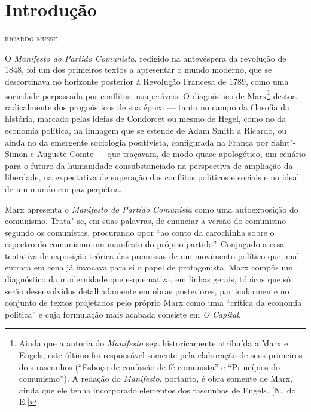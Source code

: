 \pagestyle{plain}


\chapter*{Introdução}
\begin{flushright}
\textsc{ricardo musse}
\end{flushright}

\noindent{}O \textit{Manifesto do Partido Comunista}, redigido na antevéspera da
revolução de 1848, foi um dos primeiros textos a apresentar o mundo
moderno, que se descortinava no horizonte posterior à Revolução
Francesa de 1789, como uma sociedade perpassada por conflitos
insuperáveis. O diagnóstico de Marx\footnote{ Ainda que a autoria do \textit{Manifesto} 
seja historicamente atribuída a Marx e Engels, este último foi responsável somente pela 
elaboração de seus primeiros dois rascunhos (“Esboço de confissão de fé comunista” e “Princípios do comunismo”). 
A redação do \textit{Manifesto}, portanto, é obra somente de Marx, ainda que ele tenha incorporado 
elementos dos rascunhos de Engels. [N.~do E.]} destoa radicalmente dos
prognósticos de sua época --- tanto no campo da filosofia da história,
marcado pelas ideias de Condorcet ou mesmo de Hegel, como no da
economia política, na linhagem que se estende de Adam Smith a Ricardo,
ou ainda no da emergente sociologia positivista, configurada na França
por Saint"-Simon e Auguste Comte --- que traçavam, de modo quase
apologético, um cenário para o futuro da humanidade consubstanciado na
perspectiva de ampliação da liberdade, na expectativa de superação dos
conflitos políticos e sociais e no ideal de um mundo em paz perpétua.

Marx apresenta o \textit{Manifesto do Partido Comunista} como uma
autoexposição do comunismo. Trata"-se, em suas palavras, de
enunciar a versão do comunismo segundo os comunistas, procurando opor
“ao conto da carochinha sobre o espectro do comunismo um manifesto do próprio partido”.
Conjugado a essa tentativa de exposição teórica das premissas de um
movimento político que, mal entrara em cena já invocava para si o papel
de protagonista, Marx compôs um diagnóstico da modernidade que
esquematiza, em linhas gerais, tópicos que só serão desenvolvidos
detalhadamente em obras posteriores, particularmente no conjunto de
textos projetados pelo próprio Marx como uma “crítica da economia
política” e cuja formulação mais acabada consiste em \textit{O
Capital}.

